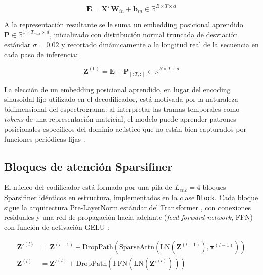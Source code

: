 \begin{equation}
    \mathbf{E} = \mathbf{X}' \, \mathbf{W}_{in} + \mathbf{b}_{in} \in \mathbb{R}^{B \times T \times d}
    \label{eq:proyeccion_entrada}
\end{equation}

A la representación resultante se le suma un embedding posicional aprendido
$\mathbf{P} \in \mathbb{R}^{1 \times T_{max} \times d}$, inicializado con distribución
normal truncada de desviación estándar $\sigma = 0.02$ y recortado dinámicamente a la
longitud real de la secuencia en cada paso de inferencia:

\begin{equation}
    \mathbf{Z}^{(0)} = \mathbf{E} + \mathbf{P}_{[:T, :]} \in \mathbb{R}^{B \times T \times d}
    \label{eq:embedding_posicional_encoder}
\end{equation}

La elección de un embedding posicional aprendido, en lugar del encoding sinusoidal fijo
utilizado en el decodificador, está motivada por la naturaleza bidimensional del
espectrograma: al interpretar las tramas temporales como \textit{tokens} de una
representación matricial, el modelo puede aprender patrones posicionales específicos del
dominio acústico que no están bien capturados por funciones periódicas fijas
\cite{dosovitskiy2021image}.

\subsection{Bloques de atención Sparsifiner}
\label{subsec:bloques_sparsifiner}

El núcleo del codificador está formado por una pila de $L_{enc} = 4$ bloques Sparsifiner
idénticos en estructura, implementados en la clase \texttt{Block}. Cada bloque sigue la
arquitectura Pre-LayerNorm estándar del Transformer \cite{xiong2020layer}, con conexiones
residuales y una red de propagación hacia adelante (\textit{feed-forward network}, FFN)
con función de activación GELU \cite{hendrycks2016gaussian}:

\begin{align}
    \mathbf{Z}'^{(l)} &= \mathbf{Z}^{(l-1)} + \text{DropPath}\!\left(\text{SparseAttn}\!\left(\text{LN}\!\left(\mathbf{Z}^{(l-1)}\right), \boldsymbol{\pi}^{(l-1)}\right)\right) \label{eq:bloque_attn} \\
    \mathbf{Z}^{(l)}  &= \mathbf{Z}'^{(l)} + \text{DropPath}\!\left(\text{FFN}\!\left(\text{LN}\!\left(\mathbf{Z}'^{(l)}\right)\right)\right) \label{eq:bloque_ffn}
\end{align}

